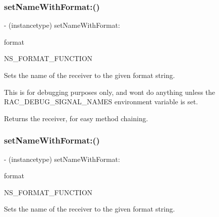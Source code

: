 \subsubsection{\texorpdfstring{set\+Name\+With\+Format\+:()}{setNameWithFormat:()}\hspace{0.1cm}{\footnotesize\ttfamily [2/3]}}
{\footnotesize\ttfamily -\/ (instancetype) set\+Name\+With\+Format\+: \begin{DoxyParamCaption}\item[{(N\+S\+String $\ast$)}]{format }\item[{,(1)}]{ }\item[{(2)}]{N\+S\+\_\+\+F\+O\+R\+M\+A\+T\+\_\+\+F\+U\+N\+C\+T\+I\+ON }\end{DoxyParamCaption}\hspace{0.3cm}{\ttfamily [implementation]}}

Sets the name of the receiver to the given format string.

This is for debugging purposes only, and won\textquotesingle{}t do anything unless the R\+A\+C\+\_\+\+D\+E\+B\+U\+G\+\_\+\+S\+I\+G\+N\+A\+L\+\_\+\+N\+A\+M\+ES environment variable is set.

Returns the receiver, for easy method chaining. \mbox{\label{interface_r_a_c_stream_aedc0b75ca3e6d0f81f006c7c3c6a1d76}} 
\subsubsection{\texorpdfstring{set\+Name\+With\+Format\+:()}{setNameWithFormat:()}\hspace{0.1cm}{\footnotesize\ttfamily [3/3]}}
{\footnotesize\ttfamily -\/ (instancetype) set\+Name\+With\+Format\+: \begin{DoxyParamCaption}\item[{(N\+S\+String $\ast$)}]{format }\item[{,(1)}]{ }\item[{(2)}]{N\+S\+\_\+\+F\+O\+R\+M\+A\+T\+\_\+\+F\+U\+N\+C\+T\+I\+ON }\end{DoxyParamCaption}\hspace{0.3cm}{\ttfamily [implementation]}}

Sets the name of the receiver to the given format string.

